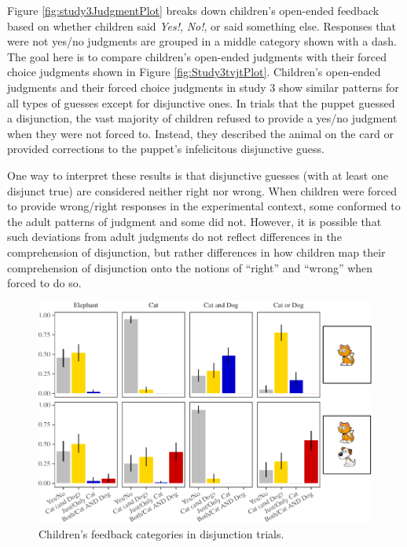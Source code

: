 \documentclass[floatsintext,man]{apa6}
\theoremstyle{definition}
\theoremstyle{definition}
\theoremstyle{definition}
\theoremstyle{remark}
\begin{document}
Figure \ref{fig:study3JudgmentPlot} breaks down children's open-ended
feedback based on whether children said \emph{Yes!}, \emph{No!}, or said
something else. Responses that were not yes/no judgments are grouped in
a middle category shown with a dash. The goal here is to compare
children's open-ended judgments with their forced choice judgments shown
in Figure \ref{fig:Study3tvjtPlot}. Children's open-ended judgments and
their forced choice judgments in study 3 show similar patterns for all
types of guesses except for disjunctive ones. In trials that the puppet
guessed a disjunction, the vast majority of children refused to provide
a yes/no judgment when they were not forced to. Instead, they described
the animal on the card or provided corrections to the puppet's
infelicitous disjunctive guess.

One way to interpret these results is that disjunctive guesses (with at
least one disjunct true) are considered neither right nor wrong. When
children were forced to provide wrong/right responses in the
experimental context, some conformed to the adult patterns of judgment
and some did not. However, it is possible that such deviations from
adult judgments do not reflect differences in the comprehension of
disjunction, but rather differences in how children map their
comprehension of disjunction onto the notions of \enquote{right} and
\enquote{wrong} when forced to do so.

\begin{figure}
\centering
\includegraphics{figs/correctivePlot-1.pdf}
\caption{\label{fig:correctivePlot}Children's feedback categories in
disjunction trials.}
\end{figure}
\end{document}
